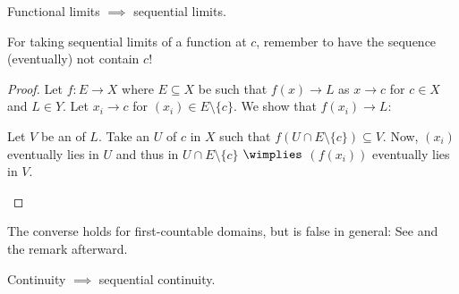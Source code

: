 	
	\begin{lem}\label{LEM: func lim => seq lims}
		Functional limits $\implies$ sequential limits.
	\end{lem}
	
	\begin{rmk}
		For taking sequential limits of a function at $c$, remember to have the sequence (eventually) not contain $c$!
	\end{rmk}
	
	\begin{proof}
		Let $f\colon E\to X$ where $E\subseteq X$ be such that $f(x)\to L$ as $x\to c$ for $c\in X$ and $L\in Y$. Let $x_i\to c$ for $(x_i)\in E\setminus\{c\}$. We show that $f(x_i)\to L$:
		\begin{subproof}
			Let $V$ be an \onbd of $L$. Take an \onbd $U$ of $c$ in $X$ such that $f(U\cap E\setminus\{c\})\subseteq V$. Now, $(x_i)$ eventually lies in $U$ and thus in $U\cap E\setminus\{c\}$ $\wimplies$ $(f(x_i))$ eventually lies in $V$.\qedhere
		\end{subproof}
	\end{proof}
	
	\begin{rmk}
		The converse holds for first-countable domains, but is false in general: See  and the remark afterward.
	\end{rmk}
	
	\begin{cor}
		Continuity $\implies$ sequential continuity.
	\end{cor}
	
